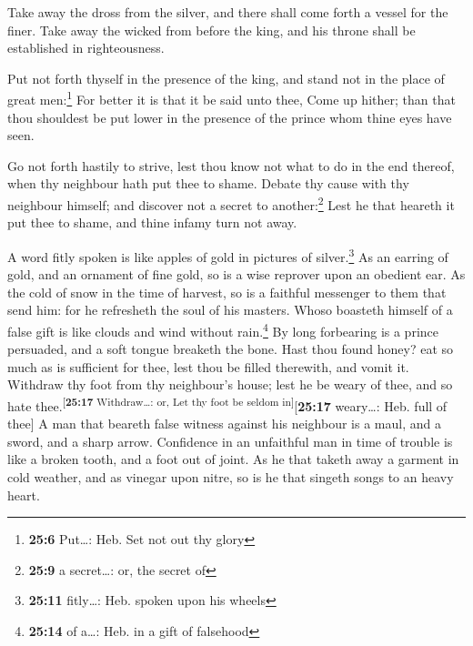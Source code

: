  Take away the dross from the silver, and there shall come
forth a vessel for the finer.  Take away the wicked from
before the king, and his throne shall be established in righteousness.

 Put not forth thyself in the presence of the king, and
stand not in the place of great men:\footnote{\textbf{25:6} Put\ldots:
  Heb. Set not out thy glory}  For better it is that it be
said unto thee, Come up hither; than that thou shouldest be put lower in
the presence of the prince whom thine eyes have seen.

 Go not forth hastily to strive, lest thou know not what
to do in the end thereof, when thy neighbour hath put thee to shame.
 Debate thy cause with thy neighbour himself; and discover
not a secret to another:\footnote{\textbf{25:9} a secret\ldots: or, the
  secret of}  Lest he that heareth it put thee to shame,
and thine infamy turn not away.

 A word fitly spoken is like apples of gold in pictures
of silver.\footnote{\textbf{25:11} fitly\ldots: Heb. spoken upon his
  wheels}  As an earring of gold, and an ornament of fine
gold, so is a wise reprover upon an obedient ear.  As the
cold of snow in the time of harvest, so is a faithful messenger to them
that send him: for he refresheth the soul of his masters.
 Whoso boasteth himself of a false gift is like clouds
and wind without rain.\footnote{\textbf{25:14} of a\ldots: Heb. in a
  gift of falsehood}  By long forbearing is a prince
persuaded, and a soft tongue breaketh the bone.  Hast
thou found honey? eat so much as is sufficient for thee, lest thou be
filled therewith, and vomit it.  Withdraw thy foot from
thy neighbour's house; lest he be weary of thee, and so hate
thee.\textsuperscript{{[}\textbf{25:17} Withdraw\ldots: or, Let thy foot
be seldom in{]}}{[}\textbf{25:17} weary\ldots: Heb. full of thee{]}
 A man that beareth false witness against his neighbour
is a maul, and a sword, and a sharp arrow.  Confidence in
an unfaithful man in time of trouble is like a broken tooth, and a foot
out of joint.  As he that taketh away a garment in cold
weather, and as vinegar upon nitre, so is he that singeth songs to an
heavy heart.


